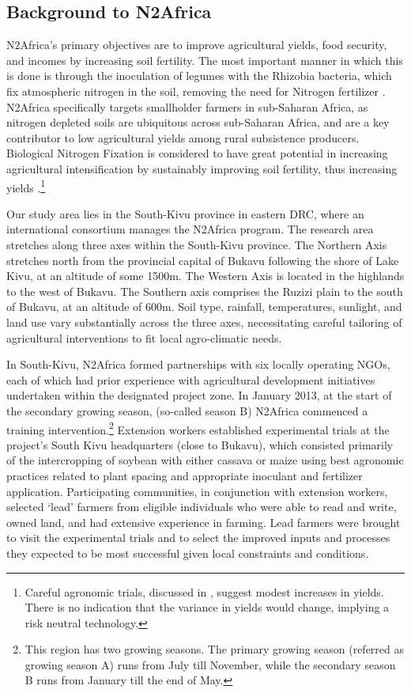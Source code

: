 \subsection{Background to N2Africa}
N2Africa’s primary objectives are to improve agricultural yields, food security, and incomes by increasing soil fertility. The most important manner in which this is done is through the inoculation of legumes with the Rhizobia bacteria, which fix atmospheric nitrogen in the soil, removing the need for Nitrogen fertilizer \citep{Wagner2012,Mulongoy1992}. N2Africa specifically targets smallholder farmers in sub-Saharan Africa, as nitrogen depleted soils are ubiquitous across sub-Saharan Africa, and are a key contributor to low agricultural yields among rural subsistence producers. Biological Nitrogen Fixation is considered to have great potential in increasing agricultural intensification by sustainably improving soil fertility, thus increasing yields \citep{Peoples1995}.\footnote{Careful agronomic trials, discussed in \citet{Vanlauwe2019}, suggest modest increases in yields. There is no indication that the variance in yields would change, implying a risk neutral technology.}

Our study area lies in the South-Kivu province in eastern DRC, where an international consortium manages the N2Africa program. The research area stretches along three axes within the South-Kivu province. The Northern Axis stretches north from the provincial capital of Bukavu following the shore of Lake Kivu, at an altitude of some 1500m. The Western Axis is located in the highlands to the west of Bukavu. The Southern axis comprises the Ruzizi plain to the south of Bukavu, at an altitude of 600m. Soil type, rainfall, temperatures, sunlight, and land use vary substantially across the three axes, necessitating careful tailoring of agricultural interventions to fit local agro-climatic needs.

In South-Kivu, N2Africa formed partnerships with six locally operating NGOs, each of which had prior experience with agricultural development initiatives undertaken within the designated project zone. In January 2013, at the start of the secondary growing season, (so-called season B)  N2Africa commenced a training intervention.\footnote{This region has two growing seasons. The primary growing season (referred as growing season A) runs from July till November, while the secondary season B runs from January till the end of May.}  Extension workers established experimental trials at the project’s South Kivu headquarters (close to Bukavu), which consisted primarily of the intercropping of soybean with either cassava or maize using best agronomic practices related to plant spacing and appropriate inoculant and fertilizer application. Participating communities, in conjunction with extension workers, selected ‘lead’ farmers from eligible individuals who were able to read and write, owned land, and had extensive experience in farming. Lead farmers were brought to visit the experimental trials and to select the improved inputs and processes they expected to be most successful given local constraints and conditions.

